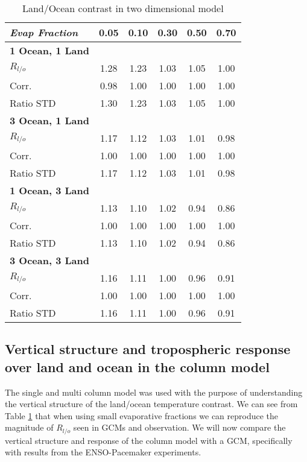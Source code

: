 \begin{center}
	\begin{table}[ht]
		\caption{Land/Ocean contrast in two dimensional model}
		\label{tab:tdm_Rlo}
		\scriptsize
	\begin{tabular}{ l  c  c  c  c  c }
		\hline
		\textit{Evap Fraction}	& 0.05  & 0.10 & 0.30  & 0.50  & 0.70 \\ \hline
		\textbf{1 Ocean, 1 Land}\\
		$R_{l/o}$ 					& 1.28  & 1.23 & 1.03  & 1.05 & 1.00\\ 
		Corr.					& 0.98  & 1.00 & 1.00  & 1.00 & 1.00\\ %
		Ratio STD          		& 1.30  & 1.23 & 1.03  & 1.05 & 1.00\\ \hline
		\textbf{3 Ocean, 1 Land}\\
		$R_{l/o}$ 					& 1.17  & 1.12 & 1.03  & 1.01 & 0.98\\ %
		Corr.					& 1.00  & 1.00 & 1.00  & 1.00 & 1.00\\ %
		Ratio STD          		& 1.17  & 1.12 & 1.03  & 1.01 & 0.98\\ \hline
		\textbf{1 Ocean, 3 Land}\\
		$R_{l/o}$ 					& 1.13  & 1.10 & 1.02  & 0.94 & 0.86\\ %
		Corr.					& 1.00  & 1.00 & 1.00  & 1.00 & 1.00\\ %
		Ratio STD          		& 1.13  & 1.10 & 1.02  & 0.94 & 0.86\\ \hline
		\textbf{3 Ocean, 3 Land}\\
		$R_{l/o}$ 					& 1.16  & 1.11 & 1.00  & 0.96 & 0.91\\ %
		Corr.					& 1.00  & 1.00 & 1.00  & 1.00 & 1.00\\ %
		Ratio STD          		& 1.16  & 1.11 & 1.00  & 0.96 & 0.91\\ \hline
	\end{tabular}
	\end{table}
\end{center}

\subsection{Vertical structure and tropospheric response over land and ocean in 
the column model}

The single and multi column model was used with the purpose of understanding the 
vertical structure of the land/ocean temperature contrast. We can see from Table 
\ref{tab:tdm_Rlo} that when using small evaporative fractions we can reproduce 
the magnitude of $R_{l/o}$ seen in GCMs and observation. We will now compare the 
vertical structure and response of the column model with a GCM, specifically 
with results from the ENSO-Pacemaker experiments.  

